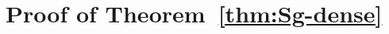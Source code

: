 \documentclass{amsart}
\begin{document}

%





\section{Proof of Theorem~\ref{thm:Sg-dense}}
\label{sec:step-2}

\end{document}

